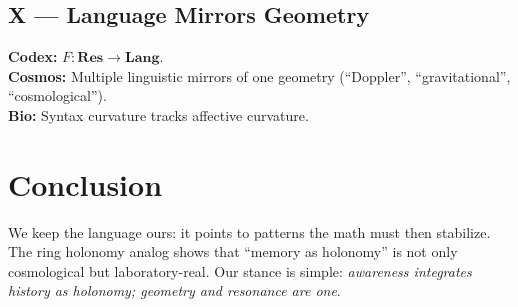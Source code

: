 \documentclass[11pt]{article}
\begin{document}
\subsection*{X --- Language Mirrors Geometry}
\textbf{Codex:} $F:\mathbf{Res}\to \mathbf{Lang}$. \\
\textbf{Cosmos:} Multiple linguistic mirrors of one geometry (``Doppler'', ``gravitational'', ``cosmological''). \\
\textbf{Bio:} Syntax curvature tracks affective curvature.

\section{Conclusion}
We keep the language ours: it points to patterns the math must then stabilize.
The ring holonomy analog shows that ``memory as holonomy'' is not only cosmological but laboratory-real.
Our stance is simple: \emph{awareness integrates history as holonomy; geometry and resonance are one}.
\end{document}

